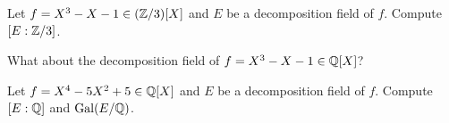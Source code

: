 \begin{exercise}
\label{xca:dec field of X^3-X-1 over Z3}
    Let $f=X^3-X-1\in (\mathbb{Z}/3)[X]$ and $E$ be a decomposition field of $f$. 
    Compute $[E:\mathbb{Z}/3]$. 
\end{exercise}

What about the decomposition field of $f=X^3-X-1\in \mathbb{Q}[X]$?

\begin{exercise}
\label{xca:dec field X^4-5X^2+5}
    Let $f=X^4-5X^2+5\in \mathbb{Q}[X]$ and $E$ be a decomposition field of $f$. 
    Compute $[E:\mathbb{Q}]$ and $\operatorname{Gal}(E/\mathbb{Q})$. 
\end{exercise}



